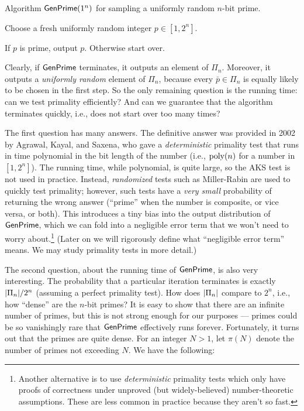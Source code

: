 \documentclass[11pt]{article}
\begin{document}
\begin{algorithm}
  \caption{Algorithm $\mathsf{GenPrime}(1^{n})$ for sampling a uniformly
    random $n$-bit prime.}
  \label{alg:genprime}
  \begin{algorithmic}[1]
    \STATE Choose a fresh uniformly random integer $p \in [1, 2^{n}]$.

    \STATE If $p$ is prime, output $p$.  Otherwise start over.
  \end{algorithmic}
\end{algorithm}

Clearly, if $\mathsf{GenPrime}$ terminates, it outputs an element of
$\Pi_{n}$.  Moreover, it outputs a \emph{uniformly random} element of
$\Pi_{n}$, because every $\bar{p} \in \Pi_{n}$ is equally likely to be
chosen in the first step.  So the only remaining question is the
running time: can we test primality efficiently?  And can we guarantee
that the algorithm terminates quickly, i.e., does not start over too
many times?

The first question has many answers.  The definitive answer was
provided in 2002 by Agrawal, Kayal, and Saxena, who gave a
\emph{deterministic} primality test that runs in time polynomial in
the bit length of the number (i.e., $\operatorname{poly}(n)$ for a number in
$[1,2^{n}]$).  The running time, while polynomial, is quite large, so
the AKS test is not used in practice.  Instead, \emph{randomized}
tests such as Miller-Rabin are used to quickly test primality;
however, such tests have a \emph{very small} probability of returning
the wrong answer (``prime'' when the number is composite, or vice
versa, or both).  This introduces a tiny bias into the output
distribution of $\mathsf{GenPrime}$, which we can fold into a negligible
error term that we won't need to worry about.\footnote{Another
  alternative is to use \emph{deterministic} primality tests which
  only have proofs of correctness under unproved (but widely-believed)
  number-theoretic assumptions.  These are less common in practice
  because they aren't so fast.}  (Later on we will rigorously define
what ``negligible error term'' means.  We may study primality tests in
more detail.)

The second question, about the running time of $\mathsf{GenPrime}$, is
also very interesting.  The probability that a particular iteration
terminates is exactly $\lvert\Pi_{n}\rvert / 2^{n}$ (assuming a perfect
primality test).  How does $\lvert\Pi_{n}\rvert$ compare to $2^{n}$, i.e.,
how ``dense'' are the $n$-bit primes?  It is easy to show that there
are an infinite number of primes, but this is not strong enough for
our purposes --- primes could be so vanishingly rare that
$\mathsf{GenPrime}$ effectively runs forever.  Fortunately, it turns out
that the primes are quite dense.  For an integer $N > 1$, let $\pi(N)$
denote the number of primes not exceeding $N$.  We have the following:
\end{document}
